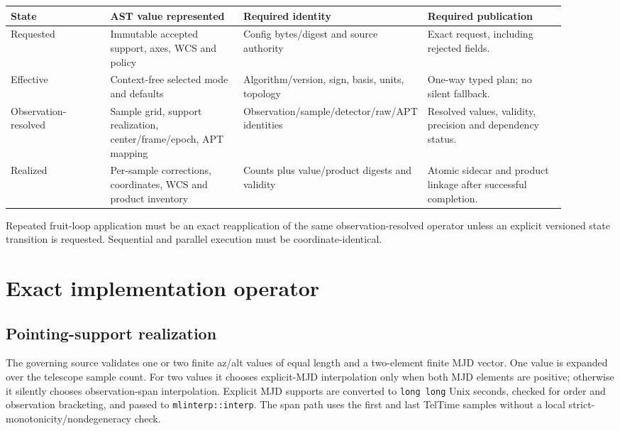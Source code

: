 \documentclass[11pt]{article}
\newcommand{\code}[1]{\nolinkurl{#1}}
\newcommand{\breakslash}{/\allowbreak}
\begin{document}
\begin{longtable}{L{0.18\linewidth}L{0.24\linewidth}L{0.24\linewidth}L{0.25\linewidth}}
\toprule
State & AST value represented & Required identity & Required publication \\
\midrule
Requested & Immutable accepted support, axes, WCS and policy & Config bytes/digest and source authority & Exact request, including rejected fields. \\
Effective & Context-free selected mode and defaults & Algorithm/version, sign, basis, units, topology & One-way typed plan; no silent fallback. \\
Observation-\allowbreak resolved & Sample grid, support realization, center\breakslash frame\breakslash epoch, APT mapping & Observation\breakslash sample\breakslash detector\breakslash raw\breakslash APT identities & Resolved values, validity, precision and dependency status. \\
Realized & Per-sample corrections, coordinates, WCS and product inventory & Counts plus value/product digests and validity & Atomic sidecar and product linkage after successful completion. \\
\bottomrule
\end{longtable}

Repeated fruit-loop application must be an exact reapplication of the same
observation-resolved operator unless an explicit versioned state transition is
requested. Sequential and parallel execution must be coordinate-identical.

\section{Exact implementation operator}

\subsection{Pointing-support realization}

The governing source validates one or two finite az/alt values of equal length
and a two-element finite MJD vector.  One value is expanded over the telescope
sample count. For two values it chooses explicit-MJD interpolation only when
both MJD elements are positive; otherwise it silently chooses observation-span
interpolation. Explicit MJD supports are converted to \code{long long} Unix
seconds, checked for order and observation bracketing, and passed to
\code{mlinterp::interp}.  The span path uses the first and last TelTime samples
without a local strict-monotonicity/nondegeneracy check.
\end{document}
